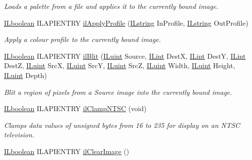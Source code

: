 \begin{DoxyCompactItemize}
\begin{DoxyCompactList}\small\item\em Loads a palette from a file and applies it to the currently bound image. \end{DoxyCompactList}\item 
\hyperlink{group__il__types_gaa6aa7c95cfdc06b4d8601ef832b7bb0a}{I\+Lboolean} I\+L\+A\+P\+I\+E\+N\+T\+R\+Y \hyperlink{group__image__manip_gad41bda3bd56aa5df16c34b98c8a50224}{il\+Apply\+Profile} (\hyperlink{group__il__types_ga683acc99ae9bac7978edfa5588962b52}{I\+Lstring} In\+Profile, \hyperlink{group__il__types_ga683acc99ae9bac7978edfa5588962b52}{I\+Lstring} Out\+Profile)
\begin{DoxyCompactList}\small\item\em Apply a colour profile to the currently bound image. \end{DoxyCompactList}\item 
\hypertarget{group__image__manip_ga5733e9e8126ebeea814e1b0f5bb9be44}{\hyperlink{group__il__types_gaa6aa7c95cfdc06b4d8601ef832b7bb0a}{I\+Lboolean} I\+L\+A\+P\+I\+E\+N\+T\+R\+Y \hyperlink{group__image__manip_ga5733e9e8126ebeea814e1b0f5bb9be44}{il\+Blit} (\hyperlink{group__il__types_gaff8e86a1072c8d7cfe387fb87c6ed8e1}{I\+Luint} Source, \hyperlink{group__il__types_ga8effe51a00daaa0878631e5af75a36cb}{I\+Lint} Dest\+X, \hyperlink{group__il__types_ga8effe51a00daaa0878631e5af75a36cb}{I\+Lint} Dest\+Y, \hyperlink{group__il__types_ga8effe51a00daaa0878631e5af75a36cb}{I\+Lint} Dest\+Z, \hyperlink{group__il__types_gaff8e86a1072c8d7cfe387fb87c6ed8e1}{I\+Luint} Src\+X, \hyperlink{group__il__types_gaff8e86a1072c8d7cfe387fb87c6ed8e1}{I\+Luint} Src\+Y, \hyperlink{group__il__types_gaff8e86a1072c8d7cfe387fb87c6ed8e1}{I\+Luint} Src\+Z, \hyperlink{group__il__types_gaff8e86a1072c8d7cfe387fb87c6ed8e1}{I\+Luint} Width, \hyperlink{group__il__types_gaff8e86a1072c8d7cfe387fb87c6ed8e1}{I\+Luint} Height, \hyperlink{group__il__types_gaff8e86a1072c8d7cfe387fb87c6ed8e1}{I\+Luint} Depth)}\label{group__image__manip_ga5733e9e8126ebeea814e1b0f5bb9be44}

\begin{DoxyCompactList}\small\item\em Blit a region of pixels from a {\itshape Source} image into the currently bound image. \end{DoxyCompactList}\item 
\hyperlink{group__il__types_gaa6aa7c95cfdc06b4d8601ef832b7bb0a}{I\+Lboolean} I\+L\+A\+P\+I\+E\+N\+T\+R\+Y \hyperlink{group__image__manip_gab2c623d693bf0f5c2f046a64af7b22ba}{il\+Clamp\+N\+T\+S\+C} (void)
\begin{DoxyCompactList}\small\item\em Clamps data values of unsigned bytes from 16 to 235 for display on an N\+T\+S\+C television. \end{DoxyCompactList}\item 
\hypertarget{group__image__manip_gae48d76d54f6f00fe54b304c29224653f}{\hyperlink{group__il__types_gaa6aa7c95cfdc06b4d8601ef832b7bb0a}{I\+Lboolean} I\+L\+A\+P\+I\+E\+N\+T\+R\+Y \hyperlink{group__image__manip_gae48d76d54f6f00fe54b304c29224653f}{il\+Clear\+Image} ()}\label{group__image__manip_gae48d76d54f6f00fe54b304c29224653f}


\end{DoxyCompactItemize}
